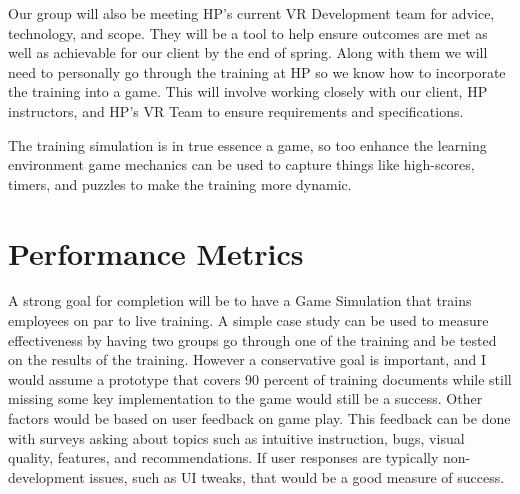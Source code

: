 \documentclass{article}
\begin{document}
Our group will also be meeting HP's current VR Development team for advice, technology, and scope. They will be a tool to help ensure outcomes are met as well as achievable for our client by the end of spring. Along with them we will need to personally go through the training at HP so we know how to incorporate the training into a game. This will involve working closely with our client, HP instructors, and HP's VR Team to ensure requirements and specifications.

The training simulation is in true essence a game, so too enhance the learning environment game mechanics can be used to capture things like high-scores, timers, and puzzles to make the training more dynamic.

\section*{Performance Metrics}
A strong goal for completion will be to have a Game Simulation that trains employees on par to live training. A simple case study can be used to measure effectiveness by having two groups go through one of the training and be tested on the results of the training.
However a conservative goal is important, and I would assume a prototype that covers 90 percent of training documents while still missing some key implementation to the game would still be a success. Other factors would be based on user feedback on game play. This feedback can be done with surveys asking about topics such as intuitive instruction, bugs, visual quality, features, and recommendations. If user responses are typically non-development issues, such as UI tweaks, that would be a good measure of success.
\end{document}

